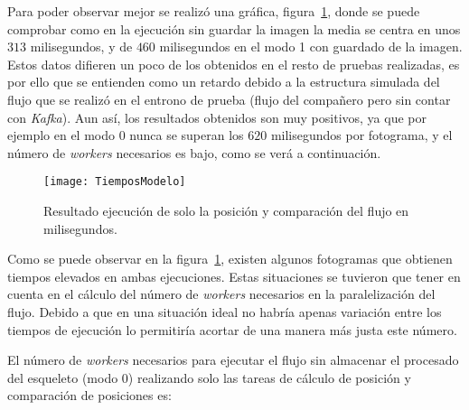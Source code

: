 {\begin{table}[h]
	\centering
	\caption{Tabla con los resultados de la ejecución solo de la posición y comparación del flujo en milisegundos.}
	\label{tab:res1}
\end{table}

Para poder observar mejor se realizó una gráfica, figura~\ref{fig:res1}, donde se puede comprobar como en la ejecución sin guardar la imagen la media se centra en unos $313$ milisegundos, y de $460$ milisegundos en el modo 1 con guardado de la imagen. Estos datos difieren un poco de los obtenidos en el resto de pruebas realizadas, es por ello que se entienden como un retardo debido a la estructura simulada del flujo que se realizó en el entrono de prueba (flujo del compañero pero sin contar con \textit{Kafka}). Aun así, los resultados obtenidos son muy positivos, ya que por ejemplo en el modo 0 nunca se superan los $620$ milisegundos por fotograma, y el número de \textit{workers} necesarios es bajo, como se verá a continuación.

\begin{figure}[h]
	\centering
	\texttt{[image: TiemposModelo]}
	\caption{Resultado ejecución de solo la posición y comparación del flujo en milisegundos.}
	\label{fig:res1}
\end{figure}

Como se puede observar en la figura~\ref{fig:res1}, existen algunos fotogramas que obtienen tiempos elevados en ambas ejecuciones. Estas situaciones se tuvieron que tener en cuenta en el cálculo del número de \textit{workers} necesarios en la paralelización del flujo. Debido a que en una situación ideal no habría apenas variación entre los tiempos de ejecución lo permitiría acortar de una manera más justa este número.

El número de \textit{workers} necesarios para ejecutar el flujo sin almacenar el procesado del esqueleto (modo 0) realizando solo las tareas de cálculo de posición y comparación de posiciones es:

}

